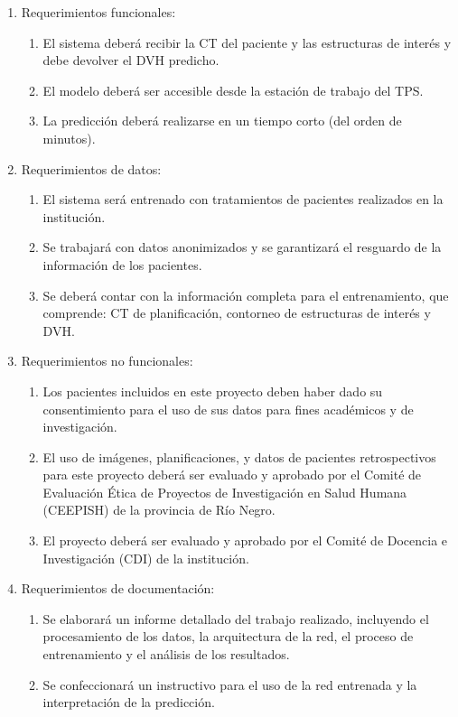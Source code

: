 \documentclass[
11pt, %
codirector, %
]{charter}
\begin{document}
\begin{enumerate}
	\item Requerimientos funcionales:
		\begin{enumerate}
			\item El sistema deberá recibir la CT del paciente y las estructuras de interés y debe devolver el DVH predicho.
			\item El modelo deberá ser accesible desde la estación de trabajo del TPS.
			\item La predicción deberá realizarse en un tiempo corto (del orden de minutos).
		\end{enumerate}
	\item Requerimientos de datos:
		\begin{enumerate}
			\item El sistema será entrenado con tratamientos de pacientes realizados en la institución.
			\item Se trabajará con datos anonimizados y se garantizará el resguardo de la información de los pacientes.
			\item Se deberá contar con la información completa para el entrenamiento, que comprende: CT de planificación, contorneo de estructuras de interés y DVH.
		\end{enumerate}
	\item Requerimientos no funcionales:
		\begin{enumerate}
			\item Los pacientes incluidos en este proyecto deben haber dado su consentimiento para el uso de sus datos para fines académicos y de investigación.
			\item El uso de imágenes, planificaciones, y datos de pacientes retrospectivos para este proyecto deberá ser evaluado y aprobado por el Comité de Evaluación Ética de Proyectos de Investigación en Salud Humana (CEEPISH) de la provincia de Río Negro.
			\item El proyecto deberá ser evaluado y aprobado por el Comité de Docencia e Investigación (CDI) de la institución.
		\end{enumerate}
\newpage 
	\item Requerimientos de documentación:
		\begin{enumerate}
			\item Se elaborará un informe detallado del trabajo realizado, incluyendo el procesamiento de los datos, la arquitectura de la red, el proceso de entrenamiento y el análisis de los resultados.
			\item Se confeccionará un instructivo para el uso de la red entrenada y la interpretación de la predicción.

\end{enumerate}
\end{enumerate}
\end{document}
